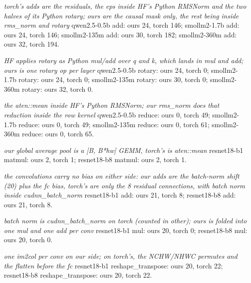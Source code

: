\begin{minipage}{\linewidth}
\emph{torch's adds are the residuals, the eps inside HF's Python RMSNorm and the two halves of its Python rotary; ours are the causal mask only, the rest being inside rms\_norm and rotary} qwen2.5-0.5b add: ours 24, torch 146; smollm2-1.7b add: ours 24, torch 146; smollm2-135m add: ours 30, torch 182; smollm2-360m add: ours 32, torch 194.
\par\smallskip
\emph{HF applies rotary as Python mul/add over q and k, which lands in mul and add; ours is one rotary op per layer} qwen2.5-0.5b rotary: ours 24, torch 0; smollm2-1.7b rotary: ours 24, torch 0; smollm2-135m rotary: ours 30, torch 0; smollm2-360m rotary: ours 32, torch 0.
\par\smallskip
\emph{the aten::mean inside HF's Python RMSNorm; our rms\_norm does that reduction inside the row kernel} qwen2.5-0.5b reduce: ours 0, torch 49; smollm2-1.7b reduce: ours 0, torch 49; smollm2-135m reduce: ours 0, torch 61; smollm2-360m reduce: ours 0, torch 65.
\par\smallskip
\emph{our global average pool is a [B, B*hw] GEMM, torch's is aten::mean} resnet18-b1 matmul: ours 2, torch 1; resnet18-b8 matmul: ours 2, torch 1.
\par\smallskip
\emph{the convolutions carry no bias on either side: our adds are the batch-norm shift (20) plus the fc bias, torch's are only the 8 residual connections, with batch norm inside cudnn\_batch\_norm} resnet18-b1 add: ours 21, torch 8; resnet18-b8 add: ours 21, torch 8.
\par\smallskip
\emph{batch norm is cudnn\_batch\_norm on torch (counted in other); ours is folded into one mul and one add per conv} resnet18-b1 mul: ours 20, torch 0; resnet18-b8 mul: ours 20, torch 0.
\par\smallskip
\emph{one im2col per conv on our side; on torch's, the NCHW/NHWC permutes and the flatten before the fc} resnet18-b1 reshape\_transpose: ours 20, torch 22; resnet18-b8 reshape\_transpose: ours 20, torch 22.
\end{minipage}

